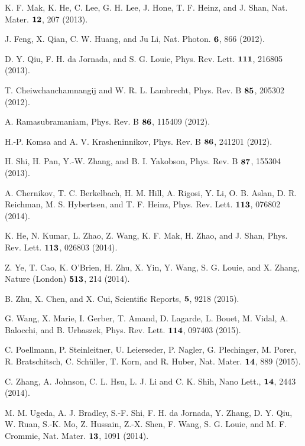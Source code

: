 \documentclass[prb,twocolumn,amsmath,amssymb,superscriptaddress,showpacs]{revtex4}
\begin{document}
\begin{thebibliography}{99}
K. F. Mak, K. He, C. Lee, G. H. Lee, J. Hone, T. F. Heinz, and J. Shan, Nat. Mater. $\bf12$, 207 (2013).

J. Feng,	 X. Qian, C. W. Huang, and Ju Li, Nat. Photon. $\bf6$, 866 (2012).

D. Y. Qiu, F. H. da Jornada, and S. G. Louie, Phys. Rev. Lett. $\bf111$, 216805 (2013).

T. Cheiwchanchamnangij and W. R. L. Lambrecht, Phys. Rev. B $\bf85$, 205302 (2012).

A. Ramasubramaniam, Phys. Rev. B $\bf86$, 115409 (2012).

H.-P. Komsa and A. V. Krasheninnikov, Phys. Rev. B $\bf86$, 241201 (2012).

H. Shi, H. Pan, Y.-W. Zhang, and B. I. Yakobson, Phys. Rev. B $\bf87$, 155304 (2013).

A. Chernikov, T. C. Berkelbach, H. M. Hill, A. Rigosi, Y. Li, O. B. Aslan, D. R. Reichman, M. S. Hybertsen, and T. F.
Heinz, Phys. Rev. Lett. $\bf113$, 076802 (2014).

K. He, N. Kumar, L. Zhao, Z. Wang, K. F. Mak, H. Zhao, and J. Shan, Phys. Rev. Lett. $\bf113$, 026803 (2014).

Z. Ye, T. Cao, K. O'Brien, H. Zhu, X. Yin, Y. Wang, S. G. Louie, and X. Zhang, Nature (London) $\bf513$, 214 (2014).

B. Zhu, X. Chen, and X. Cui, Scientific Reports, $\bf5$, 9218 (2015).

G. Wang, X. Marie, I. Gerber, T. Amand, D. Lagarde, L. Bouet, M. Vidal, A. Balocchi, and B. Urbaszek, Phys. Rev. Lett. $\bf114$, 097403 (2015).

C. Poellmann, P. Steinleitner, U. Leierseder, P. Nagler, G. Plechinger, M. Porer, R. Bratschitsch, C. Schüller,	T. Korn, and R. Huber, Nat. Mater. $\bf14$, 889 (2015).

C. Zhang, A. Johnson, C. L. Hsu, L. J. Li and C. K. Shih, Nano Lett., $\bf14$, 2443 (2014).

M. M. Ugeda, A. J. Bradley,	S.-F. Shi,	F. H. da Jornada,	Y. Zhang,	D. Y. Qiu,	 W. Ruan,	S.-K. Mo,	Z. Hussain, Z.-X. Shen,	F. Wang,	S. G. Louie, and M. F. Crommie, Nat. Mater. $\bf13$, 1091 (2014).


\end{thebibliography}
\end{document}
